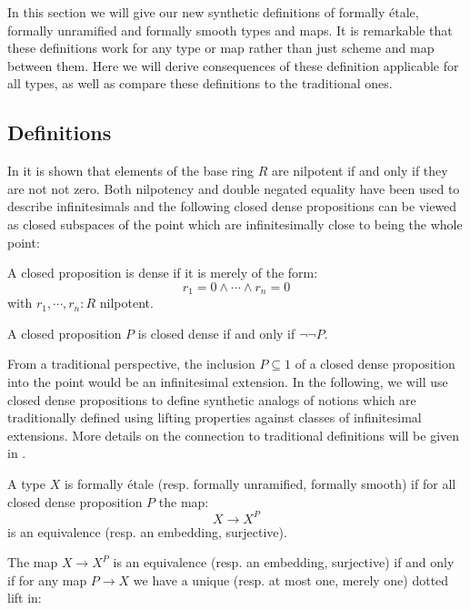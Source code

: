In this section we will give our new synthetic definitions of formally étale, formally unramified and formally smooth types and maps. It is remarkable that these definitions work for any type or map rather than just scheme and map between them. Here we will derive consequences of these definition applicable for all types, as well as compare these definitions to the traditional ones.

\subsection{Definitions}

In \cite{draft} it is shown that elements of the base ring $R$ are nilpotent if and only if they are not not zero.
Both nilpotency and double negated equality have been used to describe infinitesimals and the following closed dense propositions can be viewed as closed subspaces of the point which are infinitesimally close to being the whole point:

\begin{definition}
A closed proposition is dense if it is merely of the form:
\[r_1=0\land\cdots\land r_n=0\]
with $r_1,\cdots,r_n:R$ nilpotent.
\end{definition}

\begin{remark}
A closed proposition $P$ is closed dense if and only if $\neg\neg P$.
\end{remark}

From a traditional perspective, the inclusion $P\subseteq 1$ of a closed dense proposition into the point would be an infinitesimal extension.
In the following, we will use closed dense propositions to define synthetic analogs of notions which are traditionally defined using lifting properties against classes of infinitesimal extensions.
More details on the connection to traditional definitions will be given in .

\begin{definition}
  \label{def-etale-closed-dense}
A type $X$ is formally étale (resp. formally unramified, formally smooth) if for all closed dense proposition $P$ the map:
\[X\to X^P\]
is an equivalence (resp. an embedding, surjective).
\end{definition}

\begin{remark}
The map $X\to X^P$ is an equivalence (resp. an embedding, surjective) if and only if for any map $P\to X$ we have a unique (resp. at most one, merely one) dotted lift in:
\begin{center}
\end{center}
\end{remark}

